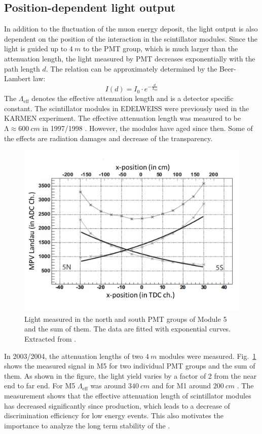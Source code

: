 \subsection{Position-dependent light output}
In addition to the fluctuation of the muon energy deposit, the light output is also dependent on the position of the interaction in the scintillator modules. Since the light is guided up to $\SI{4}{m}$ to the PMT group, which is much larger than the attenuation length, the light measured by PMT decreases exponentially with the path length $d$. The relation can be approximately determined by the Beer-Lambert law:
\begin{equation}
  I(d)=I_{0}\cdot e^{-\frac{d}{\mathrm{\Lambda}_{\mathrm{eff}}}}
\end{equation}
The $\Lambda_{\mathrm{eff}}$ denotes the effective attenuation length and is a detector specific constant.
The scintillator modules in EDELWEISS were previously used in the KARMEN experiment. The effective attenuation length was measured to be $\mathrm{\Lambda} \approx \SI{600}{cm}$ in 1997/1998 \cite{Rei98}. However, the modules have aged since then. Some of the effects are radiation damages and decrease of the transparency.

\begin{figure}[ht!]
  \centering
  \includegraphics[width=0.6\textwidth{}]{./fig/pos-dependent.png}
  \caption{Light measured in the north and south PMT groups of Module 5 and the sum of them. The data are fitted with exponential curves. Extracted from \cite{Hab04}.}
  \label{fig:pos-dependent}
\end{figure}

In 2003/2004, the attenuation lengths of two $\SI{4}{m}$ modules were measured. Fig.\ \ref{fig:pos-dependent} shows the measured signal in M5 for two individual PMT groups and the sum of them. As shown in the figure, the light yield varies by a factor of 2 from the near end to far end.
For M5 $\Lambda_{\mathrm{eff}}$ was around $\SI{340}{cm}$ and for M1 around $\SI{200}{cm}$ \cite{Hab04}. The measurement shows that the effective attenuation length of scintillator modules has decreased significantly since production, which leads to a decrease of discrimination efficiency for low energy events. This also motivates the importance to analyze the long term stability of the \mvs{}.


